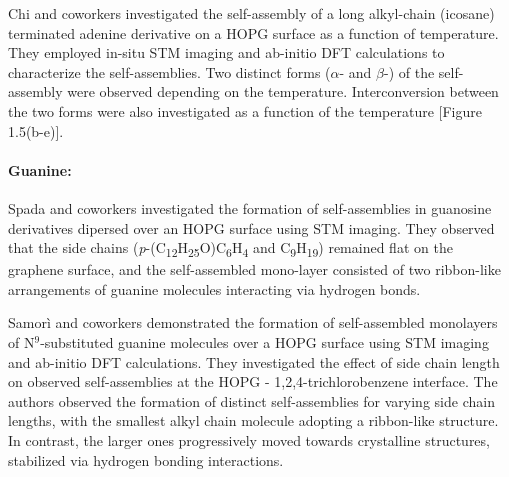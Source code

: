 Chi and coworkers investigated the self-assembly of a long alkyl-chain (icosane) terminated adenine derivative on a HOPG surface as a function of temperature.\supercite{mu_temperature-dependent_2013} They employed in-situ STM imaging and ab-initio DFT calculations to characterize the self-assemblies. Two distinct forms ($\alpha$- and $\beta$-) of the self-assembly were observed depending on the temperature. Interconversion between the two forms were also investigated as a function of the temperature [Figure 1.5(b-e)]. 

\paragraph{Guanine:} Spada and coworkers investigated the formation of self-assemblies in guanosine derivatives dipersed over an HOPG surface using STM imaging\supercite{gottarelli_self-assembly_2000}. They observed that the side chains (\textit{p}-(C\textsubscript{12}H\textsubscript{25}O)C\textsubscript{6}H\textsubscript{4} and C\textsubscript{9}H\textsubscript{19}) remained flat on the graphene surface, and the self-assembled mono-layer consisted of two ribbon-like arrangements of guanine molecules interacting via hydrogen bonds.

Samor\`{i} and coworkers demonstrated the formation of self-assembled monolayers of N$^9$-substituted guanine molecules over a HOPG surface using STM imaging and ab-initio DFT calculations.\supercite{ciesielski_nanopatterning_2010} They investigated the effect of side chain length on observed self-assemblies at the HOPG - 1,2,4-trichlorobenzene interface. The authors observed the formation of distinct self-assemblies for varying side chain lengths, with the smallest alkyl chain molecule adopting a ribbon-like structure. In contrast, the larger ones progressively moved towards crystalline structures, stabilized via hydrogen bonding interactions.

